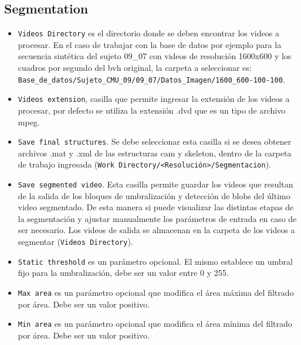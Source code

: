  \subsection{Segmentation}
 \begin{itemize}
   \item \texttt{Videos Directory} es el directorio donde se deben encontrar los videos a procesar. En el caso de trabajar con la base de datos por ejemplo para la secuencia sintética del sujeto 09\_07 con videos de resolución 1600x600 y los cuadros por segundo del bvh original, la carpeta a seleccionar es:\\ \texttt{Base\_de\_datos/Sujeto\_CMU\_09/09\_07/Datos\_Imagen/1600\_600-100-100}.
   \item \texttt{Videos extension}, casilla que permite ingresar la extensión de los videos a procesar, por defecto se utiliza la extensión .dvd que es un tipo de archivo mpeg. 
   \item \texttt{Save final structures}. Se debe seleccionar esta casilla si se desea obtener archivos .mat y .xml de las estructuras  cam y skeleton, dentro de la carpeta  de trabajo ingresada (\texttt{Work Directory/<Resolución>/Segmentacion}).
   \item \texttt{Save segmented video}. Esta casilla permite guardar  los videos que resultan de la salida de los bloques de umbralización y detección de blobs del último video segmentado. De esta manera si puede visualizar las distintas etapas de la segmentación y ajustar manualmente los parámetros de entrada en caso de ser necesario. Los videos de salida se almacenan en la carpeta de los videos a segmentar (\texttt{Videos Directory}).
   \item \texttt{Static threshold} es un parámetro opcional. El mismo establece un umbral fijo para la umbralización, debe ser un valor entre 0 y 255.
   \item \texttt{Max area} es un parámetro opcional que modifica el área máxima del filtrado por área. Debe ser un valor positivo.
   \item \texttt{Min area} es un parámetro opcional que modifica el área mínima del filtrado por área. Debe ser un valor positivo.
  \end{itemize}
